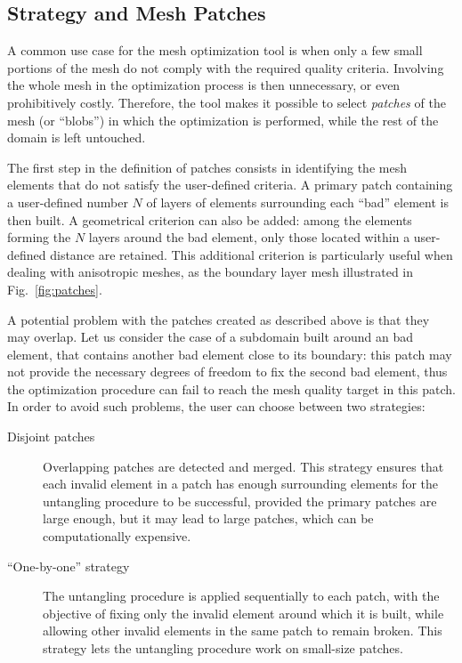 \documentclass[12pt,a4paper,a4wide]{article}
\begin{document}
\subsection{Strategy and Mesh Patches}\label{sec:strategy}

A common use case for the mesh optimization tool is when only a few
small portions of the mesh do not comply with the required quality
criteria. Involving the whole mesh in the optimization process is then
unnecessary, or even prohibitively costly. Therefore, the tool makes it
possible to select \emph{patches} of the mesh (or ``blobs'') in which
the optimization is performed, while the rest of the domain is left
untouched.

The first step in the definition of patches consists in identifying
the mesh elements that do not satisfy the user-defined criteria. A
primary patch containing a user-defined number $N$ of layers of elements
surrounding each ``bad'' element is then built. A geometrical criterion
can also be added: among the elements forming the $N$ layers around the
bad element, only those located within a user-defined distance are
retained. This additional criterion is particularly useful when dealing
with anisotropic meshes, as the boundary layer mesh illustrated in
Fig.~\ref{fig:patches}.

A potential problem with the patches created as described above is
that they may overlap. Let us consider the case of a subdomain built
around an bad element, that contains another bad element close to its
boundary: this patch may not provide the necessary degrees of freedom
to fix the second bad element, thus the optimization procedure can
fail to reach the mesh quality target in this patch.
In order to avoid such problems, the user can choose between two
strategies:
\begin{description}
\item[Disjoint patches] Overlapping patches are detected and
merged. This strategy ensures that each invalid element in a patch
has enough surrounding elements for the untangling procedure to
be successful, provided the primary patches are large enough, but
it may lead to large patches, which can be computationally expensive.
\item[``One-by-one'' strategy] The untangling procedure is applied
sequentially to each patch, with the objective of fixing only
the invalid element around which it is built, while allowing other
invalid elements in the same patch to remain broken. This strategy
lets the untangling procedure work on small-size patches.
\end{description}
\end{document}

